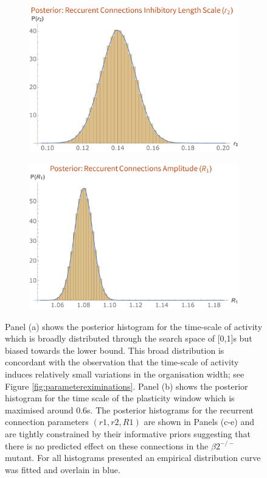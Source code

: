 \begin{figure}[h!]
\begin{subfigure}{0.475\textwidth}
		\caption{}
	\end{subfigure}
	\begin{subfigure}{0.475\textwidth}
		\centering
		\includegraphics[width=\textwidth]{images/nft_activity/posterior_r2}
		\caption{}
	\end{subfigure}
	\begin{subfigure}{0.475\textwidth}
		\centering
		\includegraphics[width=\textwidth]{images/nft_activity/posterior_R1amp}
		\caption{}
	\end{subfigure}
	\def\c{The posteriors for the relevant model parameters after an MCMC regression. }
	\caption[\c]{\label{fig:posteriors} Panel (a) shows the posterior histogram for the time-scale of activity which is broadly distributed through the search space of [0,1]s but biased towards the lower bound. This broad distribution is concordant with the observation that the time-scale of activity induces relatively small variations in the organisation width; see Figure \ref{fig:parametereximinations}. Panel (b) shows the posterior histogram for the time scale of the plasticity window which is maximised around 0.6s. The posterior histograms for the recurrent connection parameters $(r1, r2, R1)$ are shown in Panels (c-e) and are tightly constrained by their informative priors suggesting that there is no predicted effect on these connections in the $\beta2^{-/-}$ mutant. For all histograms presented an empirical distribution curve was fitted and overlain in blue.}
\end{figure}

